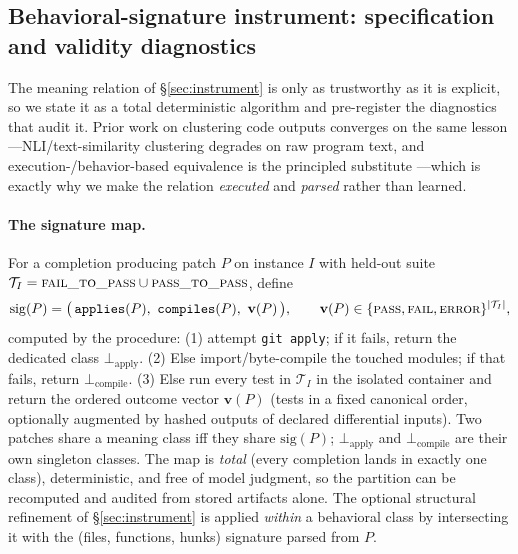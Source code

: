 \documentclass[11pt]{article}
\begin{document}
\subsection{Behavioral-signature instrument: specification and validity diagnostics}
\label{sec:sigspec}
The meaning relation of \S\ref{sec:instrument} is only as trustworthy as it is
explicit, so we state it as a total deterministic algorithm and pre-register the
diagnostics that audit it. Prior work on clustering code outputs converges on the
same lesson---NLI/text-similarity clustering degrades on raw program text, and
execution-/behavior-based equivalence is the principled substitute
\citep{farquhar2024semantic,kuhn2023semantic}---which is exactly why we make the
relation \emph{executed} and \emph{parsed} rather than learned.

\paragraph{The signature map.}
For a completion producing patch $P$ on instance $I$ with held-out suite
$\mathcal{T}_I=\textsc{fail\_to\_pass}\cup\textsc{pass\_to\_pass}$, define
\[
\mathrm{sig}(P)=\big(\,\texttt{applies}(P),\ \texttt{compiles}(P),\ \mathbf{v}(P)\,\big),
\qquad \mathbf{v}(P)\in\{\textsc{pass},\textsc{fail},\textsc{error}\}^{|\mathcal{T}_I|},
\]
computed by the procedure: (1) attempt \texttt{git apply}; if it fails, return the
dedicated class $\bot_{\mathrm{apply}}$. (2) Else import/byte-compile the touched
modules; if that fails, return $\bot_{\mathrm{compile}}$. (3) Else run every test in
$\mathcal{T}_I$ in the isolated container and return the ordered outcome vector
$\mathbf{v}(P)$ (tests in a fixed canonical order, optionally augmented by hashed
outputs of declared differential inputs). Two patches share a meaning class iff they
share $\mathrm{sig}(P)$; $\bot_{\mathrm{apply}}$ and $\bot_{\mathrm{compile}}$ are
their own singleton classes. The map is \emph{total} (every completion lands in
exactly one class), deterministic, and free of model judgment, so the partition can
be recomputed and audited from stored artifacts alone. The optional structural
refinement of \S\ref{sec:instrument} is applied \emph{within} a behavioral class by
intersecting it with the (files, functions, hunks) signature parsed from $P$.
\end{document}
